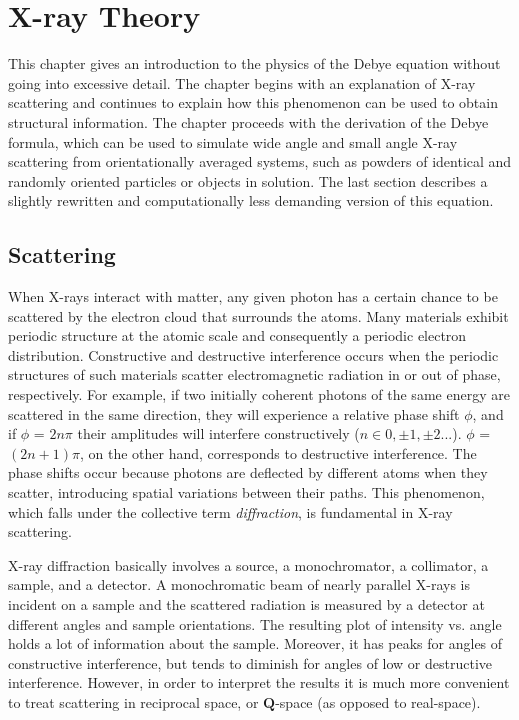 \documentclass[11pt,twoside]{report}
\begin{document}
\chapter{X-ray Theory}
This chapter gives an introduction to the physics of the Debye equation without going into excessive detail. The chapter begins with an explanation of X-ray scattering and continues to explain how this phenomenon can be used to obtain structural information.  The chapter proceeds with the derivation of the Debye formula, which can be used to simulate wide angle and small angle X-ray scattering from orientationally averaged systems, such as powders of identical and randomly oriented particles or objects in solution. The last section describes a slightly rewritten  and computationally less demanding version of this equation.

\section{Scattering}
When X-rays interact with matter, any given photon has a certain chance to be scattered by the electron cloud that surrounds the atoms. Many materials exhibit periodic structure at the atomic scale and consequently a periodic electron distribution. Constructive and destructive interference occurs when the periodic structures of such materials scatter electromagnetic radiation in or out of phase, respectively. For example, if two initially coherent photons of the same energy are scattered in the same direction, they will experience a relative phase shift $\phi$, and if $\phi$ = $2n\pi$ their amplitudes will interfere constructively ($n \in 0,  \pm1, \pm2...$). $\phi$ = $(2n+1)\pi$, on the other hand, corresponds to destructive interference. The phase shifts occur because photons are deflected by different atoms when they scatter, introducing spatial variations between their paths. This phenomenon, which falls under the collective term {\it diffraction}, is fundamental in X-ray scattering. 

\indent X-ray diffraction basically involves a source, a monochromator, a collimator, a sample, and a detector. A monochromatic beam of nearly parallel X-rays is incident on a sample and the scattered radiation is measured by a detector at different angles and sample orientations. The resulting plot of intensity vs. angle holds a lot of information about the sample. Moreover, it has peaks for angles of constructive interference, but tends to diminish for angles of low or destructive interference. However, in order to interpret the results it is much more convenient to treat scattering in reciprocal space, or ${\mathbf Q}$-space (as opposed to real-space).
\end{document}
